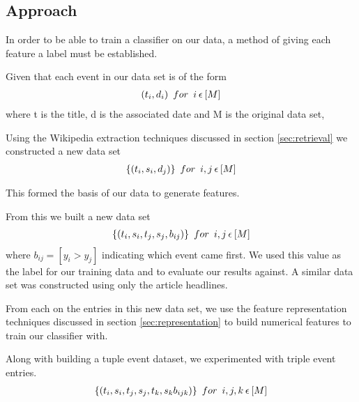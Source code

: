 \documentclass[bsc,frontabs,twoside,singlespacing,parskip,deptreport]{infthesis}     %
\begin{document}
\subsection{Approach}
In order to be able to train a classifier on our data, a method of giving each feature a label must be established.

 Given that each event in our data set is of the form
  \begin{eqnarray}
  (t_{i},d_{i}) \hspace{0.5em}for\hspace{0.5em} i \hspace{0.2em}\epsilon \hspace{0.2em} [M]\nonumber
    \end{eqnarray}
    where t is the title, d is the associated date and M is the original data set,

    Using the Wikipedia extraction techniques discussed in section \ref{sec:retrieval} we constructed a new data set
    \begin{eqnarray}
      \{(t_{i},s_{i},d_{j})\} \hspace{0.5em} for \hspace{0.5em}i,j  \hspace{0.2em}\epsilon \hspace{0.2em}[M]\nonumber
    \end{eqnarray}
    
    This formed the basis of our data to generate features.

    From this we built a new data set
    \begin{eqnarray}
      \{(t_{i},s_{i},t_{j},s_{j},b_{ij})\} \hspace{0.5em} for \hspace{0.5em} i,j \hspace{0.2em}\epsilon \hspace{0.2em}[M]\nonumber
    \end{eqnarray}
    where $b_{ij} = [y_{i} > y_{j}]$ indicating which event came first.
    We used this value as the label for our training data and to evaluate our results against.
    A similar data set was constructed using only the article headlines.
    
    From each on the entries in this new data set, we use the feature representation techniques discussed in section \ref{sec:representation} to build numerical
    features to train our classifier with.

Along with building a tuple event dataset, we experimented with triple event entries.
\begin{eqnarray}
      \{(t_{i},s_{i},t_{j},s_{j},t_{k},s_{k}b_{ijk})\} \hspace{0.5em} for \hspace{0.5em} i,j,k \hspace{0.2em}\epsilon \hspace{0.2em}[M]\nonumber
\end{eqnarray}
\end{document}
